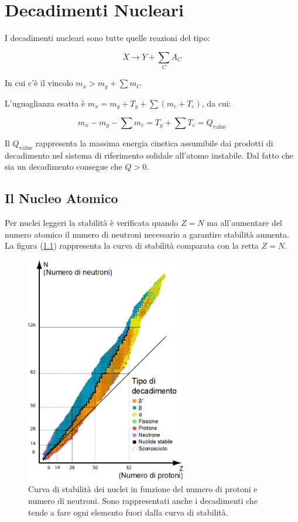 
\chapter{Decadimenti Nucleari}

I decadimenti nucleari sono tutte quelle reazioni del tipo:

\begin{equation}
X \longrightarrow Y + \sum_C A_C
\end{equation}

In cui c'è il vincolo $m_x>m_y + \sum m_C$

L'uguaglianza esatta è $m_x=m_y+T_y+\sum (m_c+T_c)$, da cui:

\begin{equation}
m_x-m_y-\sum m_c = T_y + \sum T_c = Q_{\text{value}}
\end{equation}

Il $Q_{\text{value}}$ rappresenta la massima energia cinetica assumibile dai prodotti di decadimento nel sistema di riferimento solidale all'atomo instabile. Dal fatto che sia un decadimento consegue che $Q>0$. 


\section{Il Nucleo Atomico}

Per nuclei leggeri la stabilità è verificata quando $Z=N$ ma all'aumentare del numero atomico il numero di neutroni necessario a garantire stabilità aumenta. 
La figura (\ref{curvadistabilita}) rappresenta la curva di stabilità comparata con la retta $Z=N$.\\
\begin{figure}
\centering
		\includegraphics[width=7cm, keepaspectratio]{figs/curvadistabilita.png}
		\caption{Curva di stabilità dei nuclei in funzione del numero di protoni e numero di neutroni. Sono rappresentati anche i decadimenti che tende a fare ogni elemento fuori dalla curva di stabilità.}
         \label{curvadistabilita}
\end{figure}

